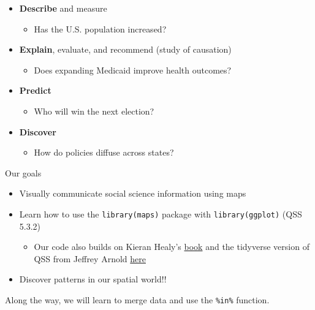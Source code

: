 \documentclass[
  letterpaper,
  DIV=11,
  numbers=noendperiod]{scrreprt}
\providecommand{\tightlist}{%
  \setlength{\itemsep}{0pt}\setlength{\parskip}{0pt}}\usepackage{longtable,booktabs,array}
\begin{document}
\begin{itemize}
\tightlist
\item
  \textbf{Describe} and measure

  \begin{itemize}
  \tightlist
  \item
    Has the U.S. population increased?
  \end{itemize}
\item
  \textbf{Explain}, evaluate, and recommend (study of causation)

  \begin{itemize}
  \tightlist
  \item
    Does expanding Medicaid improve health outcomes?
  \end{itemize}
\item
  \textbf{Predict}

  \begin{itemize}
  \tightlist
  \item
    Who will win the next election?
  \end{itemize}
\item
  \textbf{Discover}

  \begin{itemize}
  \tightlist
  \item
    How do policies diffuse across states?
  \end{itemize}
\end{itemize}

Our goals

\begin{itemize}
\tightlist
\item
  Visually communicate social science information using maps
\item
  Learn how to use the \texttt{library(maps)} package with
  \texttt{library(ggplot)} (QSS 5.3.2)

  \begin{itemize}
  \tightlist
  \item
    Our code also builds on Kieran Healy's
    \href{https://socviz.co/maps.html\#maps}{book} and the tidyverse
    version of QSS from Jeffrey Arnold
    \href{https://jrnold.github.io/qss-tidy/discovery.html}{here}
  \end{itemize}
\item
  Discover patterns in our spatial world!!
\end{itemize}

Along the way, we will learn to merge data and use the \texttt{\%in\%}
function.
\end{document}
